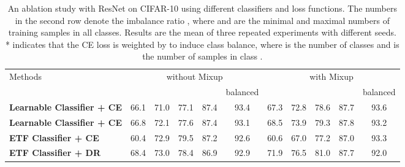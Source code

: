 \documentclass{article}
\newcommand{\<}{\left\langle}
\renewcommand{\>}{\right\rangle}
\begin{document}
\begin{table*}[t]
	\small
\renewcommand\arraystretch{0.8}
	\setlength{\tabcolsep}{0.95pt}
	\caption{An ablation study with ResNet on CIFAR-10 \cite{krizhevsky2009learning} using different classifiers and loss functions. The numbers in the second row denote the imbalance ratio , where  and  are the minimal and maximal numbers of training samples in all classes. Results are the mean of three repeated experiments with different seeds. * indicates that the CE loss is weighted by  to induce class balance, where  is the number of classes and  is the number of samples in class .}
	\label{ablation}
	\vspace{-2mm}
	\begin{center}
\begin{tabular}{l|ccccc|ccccc}
				\toprule
				\multirow{2}{*}{Methods} & \multicolumn{5}{c|}{without Mixup} & \multicolumn{5}{c}{with Mixup}\\
				&   &  &  &  & balanced  & &  &  & &  balanced\\
				\midrule
				{\tiny \textbf{Learnable Classifier + CE}}   & 66.1{\tiny}& 71.0{\tiny}& 77.1{\tiny}  & 87.4{\tiny} & 93.4{\tiny} & 67.3{\tiny}& 72.8{\tiny} & 78.6{\tiny} & 87.7{\tiny}& 93.6{\tiny}\\
				{\tiny \textbf{Learnable Classifier + CE}} & 66.8{\tiny}& 72.1{\tiny} & 77.6{\tiny}  & 87.4{\tiny} & 93.1{\tiny}  & 68.5{\tiny}& 73.9{\tiny} & 79.3{\tiny} & 87.8{\tiny}& 93.2{\tiny}\\
{\tiny \textbf{ETF Classifier +  CE}}   & 60.4{\tiny} & 72.9{\tiny} & 79.5{\tiny} & 87.2{\tiny} & 92.6{\tiny} & 60.6{\tiny} & 67.0{\tiny} & 77.2{\tiny} & 87.0{\tiny}& 93.3{\tiny} \\
				{\tiny \textbf{ETF Classifier +  DR}}    & 68.4{\tiny} & 73.0{\tiny} & 78.4{\tiny} & 86.9{\tiny} & 92.9{\tiny}  & 71.9{\tiny} & 76.5{\tiny} & 81.0{\tiny} & 87.7{\tiny} & 92.0{\tiny}\\
				\bottomrule
			\end{tabular}
\end{center}
\vspace{-4mm}
\end{table*}
\end{document}
